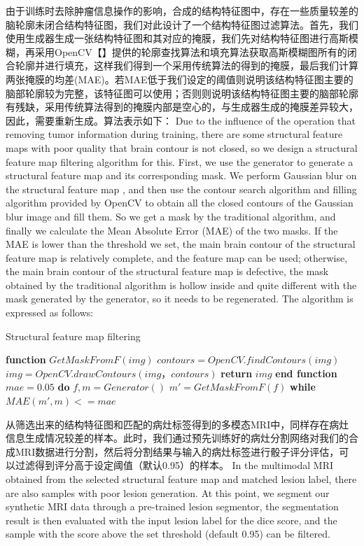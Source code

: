 \documentclass[letterpaper]{article} %
\begin{document}
由于训练时去除肿瘤信息操作的影响，合成的结构特征图中，存在一些质量较差的脑轮廓未闭合结构特征图，我们对此设计了一个结构特征图过滤算法。首先，我们使用生成器生成一张结构特征图和其对应的掩膜，我们先对结构特征图进行高斯模糊\cite{92wink2004denoising}，再采用OpenCV【】提供的轮廓查找算法和填充算法获取高斯模糊图所有的闭合轮廓并进行填充，这样我们得到一个采用传统算法的得到的掩膜，最后我们计算两张掩膜的均差(MAE)。若MAE低于我们设定的阈值则说明该结构特征图主要的脑部轮廓较为完整，该特征图可以使用；否则则说明该结构特征图主要的脑部轮廓有残缺，采用传统算法得到的掩膜内部是空心的，与生成器生成的掩膜差异较大，因此，需要重新生成。算法表示如下：
Due to the influence of the operation that removing tumor information during training, there are some structural feature maps with poor quality that brain contour is not closed, so we design a structural feature map filtering algorithm for this. First, we use the generator to generate a structural feature map and its corresponding mask. We perform Gaussian blur\cite{92wink2004denoising} on the structural feature map , and then use the contour search algorithm and filling algorithm provided by OpenCV to obtain all the closed contours of the Gaussian blur image and fill them. So we get a mask by the traditional algorithm, and finally we calculate the Mean Absolute Error (MAE) of the two masks. If the MAE is lower than the threshold we set, the main brain contour of the structural feature map is relatively complete, and the feature map can be used; otherwise, the main brain contour of the structural feature map is defective, the mask obtained by the traditional algorithm is hollow inside and quite different with the mask generated by the generator, so it needs to be regenerated. The algorithm is expressed as follows:
\begin{algorithm}
	\caption{Structural feature map filtering}
	\label{alg:3}
	\begin{algorithmic}[1]
		\State \textbf{function} $GetMaskFromF(img)$
		\State \indent$contours = OpenCV.findContours(img)$
		\State \indent$img =OpenCV.drawContours(img，contours)$
		\State \indent\textbf{return} $img$
		\State \textbf{end function}
		\State
		\State $mae=0.05$
		\State \textbf{do} 
		\State \indent$f, m = Generator()$
		\State \indent$m'= GetMaskFromF(f)$
		\State \textbf{while} $MAE(m',m) <= mae$
	\end{algorithmic}  
\end{algorithm}

从筛选出来的结构特征图和匹配的病灶标签得到的多模态MRI中，同样存在病灶信息生成情况较差的样本。此时，我们通过预先训练好的病灶分割网络对我们的合成MRI数据进行分割，然后将分割结果与输入的病灶标签进行骰子评分评估，可以过滤得到评分高于设定阈值（默认0.95）的样本。
In the multimodal MRI obtained from the selected structural feature map and matched lesion label, there are also samples with poor lesion generation. At this point, we segment our synthetic MRI data through a pre-trained lesion segmentor, the segmentation result is then evaluated with the input lesion label for the dice score, and the sample with the score above the set threshold (default 0.95) can be filtered.
\end{document}
